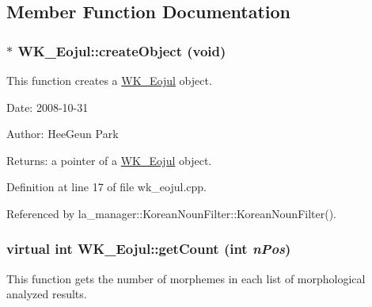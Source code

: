\subsection{Member Function Documentation}
\hypertarget{classWK__Eojul_46148f4762f080b15e5bd8e21f98a8a8}{
\subsubsection[{createObject}]{ $\ast$ WK\_\-Eojul::createObject (void)}}
\label{classWK__Eojul_46148f4762f080b15e5bd8e21f98a8a8}


This function creates a \hyperlink{classWK__Eojul}{WK\_\-Eojul} object. 

\begin{Desc}
\item[Date:]2008-10-31 \end{Desc}
\begin{Desc}
\item[Author:]HeeGeun Park \end{Desc}
\begin{Desc}
\item[Returns:]a pointer of a \hyperlink{classWK__Eojul}{WK\_\-Eojul} object. \end{Desc}


Definition at line 17 of file wk\_\-eojul.cpp.

Referenced by la\_\-manager::KoreanNounFilter::KoreanNounFilter().\hypertarget{classWK__Eojul_ebb07e0b90314607d6742517a6de6fbd}{
\subsubsection[{getCount}]{\setlength{\rightskip}{0pt plus 5cm}virtual int WK\_\-Eojul::getCount (int {\em nPos})}}
\label{classWK__Eojul_ebb07e0b90314607d6742517a6de6fbd}


This function gets the number of morphemes in each list of morphological analyzed results. 


